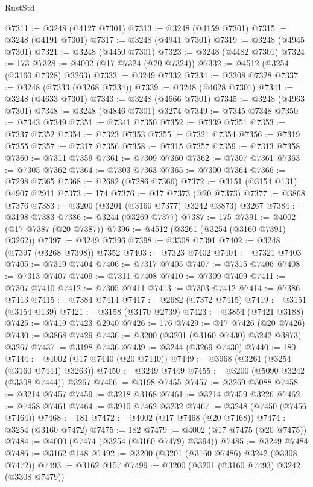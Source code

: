\begin{lexlean}{RustStd}
\begin{coremodule}
{\begin{coremodule}
{{{{{{{{{{{{{{{{{{{{{{{{{@7311 := @3248 (@4127 @7301)
@7313 := @3248 (@4159 @7301)
@7315 := @3248 (@4191 @7301)
@7317 := @3248 (@4941 @7301)
@7319 := @3248 (@4945 @7301)
@7321 := @3248 (@4450 @7301)
@7323 := @3248 (@4482 @7301)
@7324 := 173
@7328 := @4002 (@17 @7324 (@20 @7324))
@7332 := @4512 (@3254 (@3160 @7328) @3263)
@7333 := @3249 @7332
@7334 := @3308 @7328
@7337 := @3248 (@7333 (@3268 @7334))
@7339 := @3248 (@4628 @7301)
@7341 := @3248 (@4633 @7301)
@7343 := @3248 (@4666 @7301)
@7345 := @3248 (@4963 @7301)
@7348 := @3248 (@4846 @7301) @3274
@7349 := @7345 @7348
@7350 := @7343 @7349
@7351 := @7341 @7350
@7352 := @7339 @7351
@7353 := @7337 @7352
@7354 := @7323 @7353
@7355 := @7321 @7354
@7356 := @7319 @7355
@7357 := @7317 @7356
@7358 := @7315 @7357
@7359 := @7313 @7358
@7360 := @7311 @7359
@7361 := @7309 @7360
@7362 := @7307 @7361
@7363 := @7305 @7362
@7364 := @7303 @7363
@7365 := @7300 @7364
@7366 := @7298 @7365
@7368 := @2682 (@7286 @7366)
@7372 := @3151 (@3154 @131) @4907 @2911
@7373 := 174
@7376 := @17 @7373 (@20 @7373)
@7377 := @3868 @7376
@7383 := @3200 (@3201 (@3160 @7377) @3242 @3873) @3267
@7384 := @3198 @7383
@7386 := @3244 (@3269 @7377)
@7387 := 175
@7391 := @4002 (@17 @7387 (@20 @7387))
@7396 := @4512 (@3261 (@3254 (@3160 @7391) @3262))
@7397 := @3249 @7396
@7398 := @3308 @7391
@7402 := @3248 (@7397 (@3268 @7398)) @7352
@7403 := @7323 @7402
@7404 := @7321 @7403
@7405 := @7319 @7404
@7406 := @7317 @7405
@7407 := @7315 @7406
@7408 := @7313 @7407
@7409 := @7311 @7408
@7410 := @7309 @7409
@7411 := @7307 @7410
@7412 := @7305 @7411
@7413 := @7303 @7412
@7414 := @7386 @7413
@7415 := @7384 @7414
@7417 := @2682 (@7372 @7415)
@7419 := @3151 (@3154 @139)
@7421 := @3158 (@3170 @2739)
@7423 := @3854 (@7421 @3188)
@7425 := @7419 @7423 @2940
@7426 := 176
@7429 := @17 @7426 (@20 @7426)
@7430 := @3868 @7429
@7436 := @3200 (@3201 (@3160 @7430) @3242 @3873) @3267
@7437 := @3198 @7436
@7439 := @3244 (@3269 @7430)
@7440 := 180
@7444 := @4002 (@17 @7440 (@20 @7440))
@7449 := @3968 (@3261 (@3254 (@3160 @7444) @3263))
@7450 := @3249 @7449
@7455 := @3200 (@5090 @3242 (@3308 @7444)) @3267
@7456 := @3198 @7455
@7457 := @3269 @5088
@7458 := @3214 @7457
@7459 := @3218 @3168
@7461 := @3214 @7459 @3226
@7462 := @7458 @7461
@7464 := @3910 @7462 @3232
@7467 := @3248 (@7450 (@7456 @7464))
@7468 := 181
@7472 := @4002 (@17 @7468 (@20 @7468))
@7474 := @3254 (@3160 @7472)
@7475 := 182
@7479 := @4002 (@17 @7475 (@20 @7475))
@7484 := @4000 (@7474 (@3254 (@3160 @7479) @3394))
@7485 := @3249 @7484
@7486 := @3162 @148
@7492 := @3200 (@3201 (@3160 @7486) @3242 (@3308 @7472))
@7493 := @3162 @157
@7499 := @3200 (@3201 (@3160 @7493) @3242 (@3308 @7479))
}}}}}}}}}}}}}}}}}}}}}}}}}
\end{coremodule}}
\end{coremodule}
\end{lexlean}
